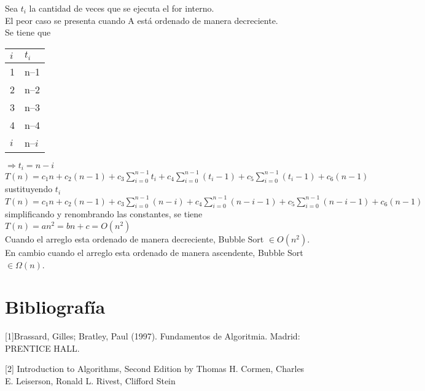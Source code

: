 \documentclass[12pt,twoside]{article}
\begin{document}
	Sea $t_i$ la cantidad de veces que se ejecuta el for interno.\\
	El peor caso se presenta cuando A est\'{a} ordenado de manera decreciente.\\
	Se tiene que\\
	\begin{tabular}{l | l}
	$i$& $t_i$\\
	\hline
	1 &n--1\\
	2 &n--2\\
	3 &n--3\\
	4 &n--4\\
	$i$ &n--$i$
	\end{tabular}
	$\Rightarrow t_i = n - i$\\
	$T(n) = c_1n + c_2(n-1) + c_3\displaystyle\sum_{i=0}^{n-1}t_i + c_4\displaystyle\sum_{i=0}^{n-1}(t_i-1)+ c_5\displaystyle\sum_{i=0}^{n-1}(t_i-1)+ c_6(n-1)  $\\
	sustituyendo $t_i$\\
	$T(n) = c_1n + c_2(n-1) + c_3\displaystyle\sum_{i=0}^{n-1}(n - i) + c_4\displaystyle\sum_{i=0}^{n-1}(n - i-1)+ c_5\displaystyle\sum_{i=0}^{n-1}(n - i-1)+ c_6(n-1)  $
	\\simplificando y renombrando las constantes, se tiene\\
	$T(n) = an^2 = bn +c = O(n^2)$
	\\Cuando el arreglo esta ordenado de manera decreciente, Bubble Sort $\in O(n^2)$.
	\\En cambio cuando el arreglo esta ordenado de manera ascendente, Bubble Sort $\in \Omega(n)$.\\


\section{Bibliograf\'ia}

[1]Brassard, Gilles; Bratley, Paul (1997). Fundamentos de Algoritmia. Madrid: PRENTICE HALL.

[2] Introduction to Algorithms, Second Edition by Thomas H. Cormen, Charles E. Leiserson, Ronald L. Rivest, Clifford Stein
\end{document}
